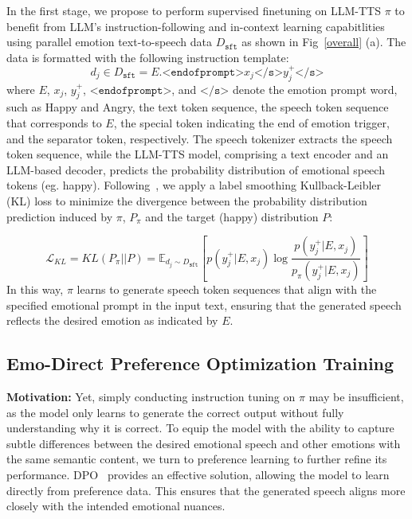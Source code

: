 \documentclass[conference]{IEEEtran}
\begin{document}
In the first stage, we propose to perform supervised finetuning on LLM-TTS $\pi$ to benefit from LLM's instruction-following and in-context learning capabitlities using parallel emotion text-to-speech data $D_\texttt{sft}$ as shown in Fig~\ref{overall} (a). The data is formatted with the following instruction template: 
\[
d_j \in D_\texttt{sft} = E. \texttt{<endofprompt>} x_j \texttt{</s>} y_j^{+} \texttt{</s>}
\]
where $E$, $x_j$, $y_j^{+}$, $\texttt{<endofprompt>}$, and $\texttt{</s>}$ denote the emotion prompt word, such as Happy and Angry, the text token sequence, the speech token sequence that corresponds to $E$, the special token indicating the end of emotion trigger, and the separator token, respectively. The speech tokenizer extracts the speech token sequence, while the LLM-TTS model, comprising a text encoder and an LLM-based decoder, predicts the probability distribution of emotional speech tokens (eg. happy). Following~\cite{du2024cosyvoice}, we apply a label smoothing Kullback-Leibler (KL) loss to minimize the divergence between the probability distribution prediction induced by $\pi$, $P_{\pi}$ and the target (happy) distribution $P$:

\small
\[
\mathcal{L}_{KL} = KL(P_{\pi}||P) = \mathbb{E}_{d_j\sim D_\texttt{sft}} \left[ p(y^+_j | E, x_j) \log \frac{p(y^+_j | E, x_j)}{p_{\pi}(y^+_j | E, x_j)} \right]
\]
\normalsize
In this way, $\pi$ learns to generate speech token sequences that align with the specified emotional prompt in the input text, ensuring that the generated speech reflects the desired emotion as indicated by $E$.
\vspace{-0.1cm}
\subsection{Emo-Direct Preference Optimization Training}
\vspace{-0.1cm}
\textbf{Motivation:} Yet, simply conducting instruction tuning on $\pi$ may be insufficient, as the model only learns to generate the correct output without fully understanding why it is correct. To equip the model with the ability to capture subtle differences between the desired emotional speech and other emotions with the same semantic content, we turn to preference learning to further refine its performance. DPO~\cite{rafailov2023direct} provides an effective solution, allowing the model to learn directly from preference data. This ensures that the generated speech aligns more closely with the intended emotional nuances. 
\end{document}
